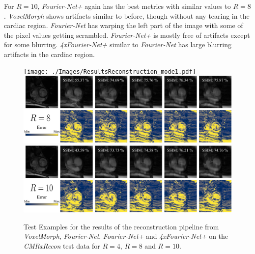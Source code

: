 For $R=10$, \emph{Fourier-Net+} again has the best metrics with similar values to $R=8$. \emph{VoxelMorph} shows artifacts similar to before, though without any tearing in the cardiac region. \emph{Fourier-Net} has warping the left part of the image with some of the pixel values getting scrambled. \emph{Fourier-Net+} is mostly free of artifacts except for some blurring. \emph{4xFourier-Net+} similar to \emph{Fourier-Net} has large blurring artifacts in the cardiac region.

\begin{figure}[H] %
	\centering
	\texttt{[image: ./Images/ResultsReconstruction\_mode1.pdf]} 
	\includegraphics[width=\linewidth]{./Images/ResultsReconstruction_mode2.pdf}
	\includegraphics[width=\linewidth]{./Images/ResultsReconstruction_mode3.pdf}
	\caption{Test Examples for the results of the reconstruction pipeline from \emph{VoxelMorph}, \emph{Fourier-Net}, \emph{Fourier-Net+} and \emph{4xFourier-Net+} on the \emph{CMRxRecon} test data for $R=4$, $R=8$ and $R=10$.}
	\label{fig:ResultsReconstruction}
\end{figure}